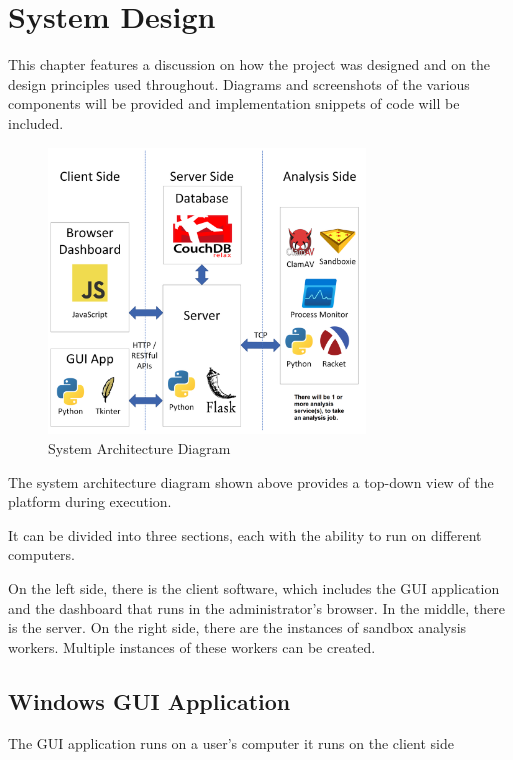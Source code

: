 \chapter{System Design}

This chapter features a discussion on how the project was designed
and on the design principles used throughout.
Diagrams and screenshots of the various components will be provided
and implementation snippets of code will be included.

\begin{figure}[h!]
    \centering
    \includegraphics[width=0.75\textwidth]{images/diagrams/architecture}
    \caption{System Architecture Diagram}
    \label{image:sysArchitecture}
\end{figure}

The system architecture diagram shown above provides
a top-down view of the platform during execution.

It can be divided into three sections,
each with the ability to run on different computers.

On the left side, there is the client software,
which includes the GUI application and the dashboard
that runs in the administrator's browser.
In the middle, there is the server. On the right side,
there are the instances of sandbox analysis workers.
Multiple instances of these workers can be created.

\section{Windows GUI Application}
The GUI application runs on a user's computer it runs on the client side


